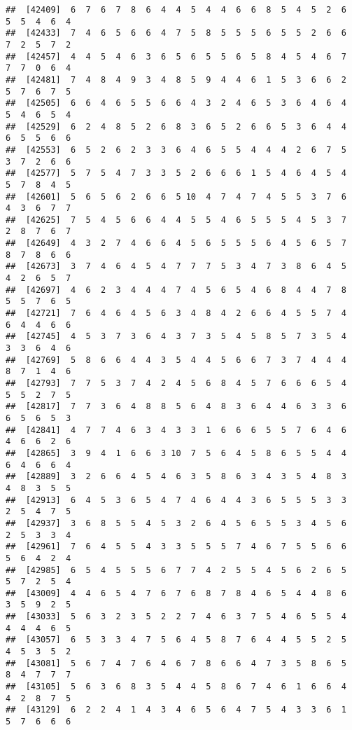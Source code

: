 \documentclass[
]{book}
\begin{document}
\begin{verbatim}
##  [42409]  6  7  6  7  8  6  4  4  5  4  4  6  6  8  5  4  5  2  6  5  5  4  6  4
##  [42433]  7  4  6  5  6  6  4  7  5  8  5  5  5  6  5  5  2  6  6  7  2  5  7  2
##  [42457]  4  4  5  4  6  3  6  5  6  5  5  6  5  8  4  5  4  6  7  7  7  0  6  4
##  [42481]  7  4  8  4  9  3  4  8  5  9  4  4  6  1  5  3  6  6  2  5  7  6  7  5
##  [42505]  6  6  4  6  5  5  6  6  4  3  2  4  6  5  3  6  4  6  4  5  4  6  5  4
##  [42529]  6  2  4  8  5  2  6  8  3  6  5  2  6  6  5  3  6  4  4  6  5  5  6  6
##  [42553]  6  5  2  6  2  3  3  6  4  6  5  5  4  4  4  2  6  7  5  3  7  2  6  6
##  [42577]  5  7  5  4  7  3  3  5  2  6  6  6  1  5  4  6  4  5  4  5  7  8  4  5
##  [42601]  5  6  5  6  2  6  6  5 10  4  7  4  7  4  5  5  3  7  6  4  3  6  7  7
##  [42625]  7  5  4  5  6  6  4  4  5  5  4  6  5  5  5  4  5  3  7  2  8  7  6  7
##  [42649]  4  3  2  7  4  6  6  4  5  6  5  5  5  6  4  5  6  5  7  8  7  8  6  6
##  [42673]  3  7  4  6  4  5  4  7  7  7  5  3  4  7  3  8  6  4  5  4  2  6  5  7
##  [42697]  4  6  2  3  4  4  4  7  4  5  6  5  4  6  8  4  4  7  8  5  5  7  6  5
##  [42721]  7  6  4  6  4  5  6  3  4  8  4  2  6  6  4  5  5  7  4  6  4  4  6  6
##  [42745]  4  5  3  7  3  6  4  3  7  3  5  4  5  8  5  7  3  5  4  3  3  6  4  6
##  [42769]  5  8  6  6  4  4  3  5  4  4  5  6  6  7  3  7  4  4  4  8  7  1  4  6
##  [42793]  7  7  5  3  7  4  2  4  5  6  8  4  5  7  6  6  6  5  4  5  5  2  7  5
##  [42817]  7  7  3  6  4  8  8  5  6  4  8  3  6  4  4  6  3  3  6  6  5  6  5  3
##  [42841]  4  7  7  4  6  3  4  3  3  1  6  6  6  5  5  7  6  4  6  4  6  6  2  6
##  [42865]  3  9  4  1  6  6  3 10  7  5  6  4  5  8  6  5  5  4  4  6  4  6  6  4
##  [42889]  3  2  6  6  4  5  4  6  3  5  8  6  3  4  3  5  4  8  3  4  8  3  5  5
##  [42913]  6  4  5  3  6  5  4  7  4  6  4  4  3  6  5  5  5  3  3  2  5  4  7  5
##  [42937]  3  6  8  5  5  4  5  3  2  6  4  5  6  5  5  3  4  5  6  2  5  3  3  4
##  [42961]  7  6  4  5  5  4  3  3  5  5  5  7  4  6  7  5  5  6  6  5  6  4  2  4
##  [42985]  6  5  4  5  5  5  6  7  7  4  2  5  5  4  5  6  2  6  5  5  7  2  5  4
##  [43009]  4  4  6  5  4  7  6  7  6  8  7  8  4  6  5  4  4  8  6  3  5  9  2  5
##  [43033]  5  6  3  2  3  5  2  2  7  4  6  3  7  5  4  6  5  5  4  4  4  4  6  5
##  [43057]  6  5  3  3  4  7  5  6  4  5  8  7  6  4  4  5  5  2  5  4  5  3  5  2
##  [43081]  5  6  7  4  7  6  4  6  7  8  6  6  4  7  3  5  8  6  5  8  4  7  7  7
##  [43105]  5  6  3  6  8  3  5  4  4  5  8  6  7  4  6  1  6  6  4  4  2  8  7  5
##  [43129]  6  2  2  4  1  4  3  4  6  5  6  4  7  5  4  3  3  6  1  5  7  6  6  6

\end{verbatim}
\end{document}
